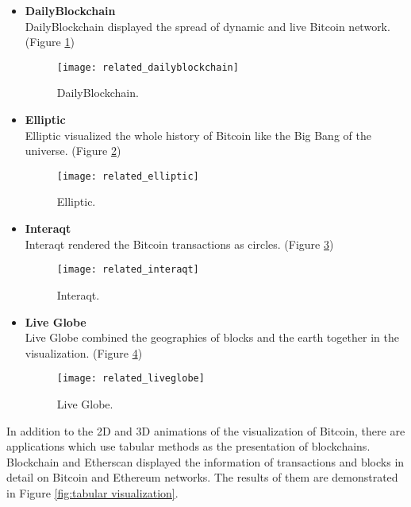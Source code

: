 \begin{itemize}
    \clearpage
    \vspace*{\fill}
    \item \textbf{DailyBlockchain} \cite{dailyblockchain} \\
        DailyBlockchain  displayed the spread of dynamic and live Bitcoin network. (Figure \ref{fig:dailyblockchain})
        \begin{figure}[htb]
            \centering
            \texttt{[image: related\_dailyblockchain]}
            \caption{DailyBlockchain.}
            \label{fig:dailyblockchain}
        \end{figure}
    \item \textbf{Elliptic} \cite{elliptic} \\
        Elliptic visualized the whole history of Bitcoin like the Big Bang of the universe. (Figure \ref{fig:elliptic})
        \begin{figure}[htb]
            \centering
            \texttt{[image: related\_elliptic]}
            \caption{Elliptic.}
            \label{fig:elliptic}
        \end{figure}
    \vspace*{\fill}
    \clearpage
    \item \textbf{Interaqt} \cite{interaqt} \\
        Interaqt rendered the Bitcoin transactions as circles. (Figure \ref{fig:interaqt})
        \begin{figure}[htb]
            \centering
            \texttt{[image: related\_interaqt]}
            \caption{Interaqt.}
            \label{fig:interaqt}
        \end{figure}
    \item \textbf{Live Globe} \cite{liveglobe} \\
        Live Globe combined the geographies of blocks and the earth together in the visualization. (Figure \ref{fig:live globe})
        \begin{figure}[htb]
            \centering
            \texttt{[image: related\_liveglobe]}
            \caption{Live Globe.}
            \label{fig:live globe}
        \end{figure}
\end{itemize}

In addition to the 2D and 3D animations of the visualization of Bitcoin, there are applications which use tabular methods as the presentation of blockchains. Blockchain \cite{blockchain} and Etherscan \cite{etherscan} displayed the information of transactions and blocks in detail on Bitcoin and Ethereum networks. The results of them are demonstrated in Figure \ref{fig:tabular visualization}.

